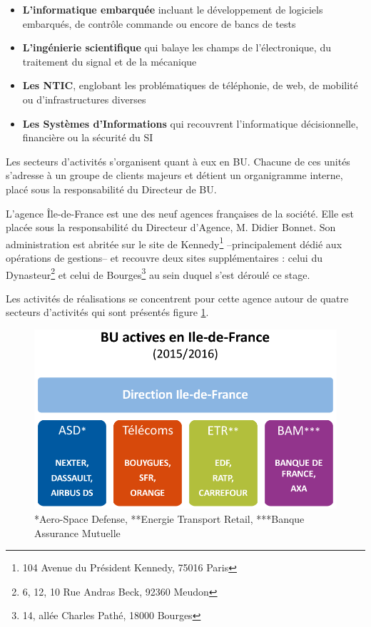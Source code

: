 \begin{itemize}
 \item \textbf{L'informatique embarquée} incluant le développement de logiciels embarqués, de contrôle commande ou encore de bancs de tests   
 \item \textbf{L'ingénierie scientifique} qui balaye les champs de l'électronique, du traitement du signal et de la mécanique
 \item \textbf{Les \gls{NTIC}}, englobant les problématiques de téléphonie, de web, de mobilité ou d'infrastructures diverses
 \item \textbf{Les Systèmes d'Informations} qui recouvrent l'informatique décisionnelle, financière ou la sécurité du \gls{SI}
\end{itemize}

Les secteurs d'activités s'organisent quant à eux en \gls{BU}. Chacune de ces unités s'adresse à un groupe de clients majeurs et détient un organigramme interne, placé sous la responsabilité du Directeur de \gls{BU}. 

L'agence Île-de-France est une des neuf agences françaises de la société. Elle est placée sous la responsabilité du Directeur d'Agence, M. Didier Bonnet.
Son administration est abritée sur le site de Kennedy\footnote{104 Avenue du Président Kennedy, 75016 Paris} --principalement dédié aux opérations de gestions-- et recouvre deux sites supplémentaires : celui du 
Dynasteur\footnote{6, 12, 10 Rue Andras Beck, 92360 Meudon} et celui de Bourges\footnote{14, allée Charles Pathé, 18000 Bourges } au sein duquel s'est déroulé ce stage. 

Les activités de réalisations se concentrent pour cette agence autour de quatre secteurs d'activités qui sont présentés figure \ref{fig:BU-IDF}. 

\begin{figure}[h]
  \centering
    \includegraphics[width=.5\linewidth]{figures/BU-clients-IDF}
    \caption*{*Aero-Space Defense, **Energie Transport Retail, ***Banque Assurance Mutuelle}  
  \label{fig:BU-IDF}
\end{figure}

